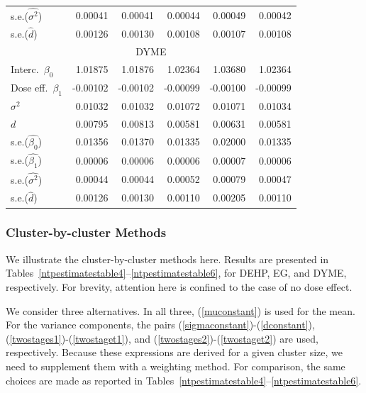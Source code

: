 \documentclass[11pt,a5paper,twoside]{book}
\begin{document}
\begin{table}[!t]
\begin{center}
{\begin{tabular}{lrrrrr}
 s.e.($\widehat{\sigma^2}$) & 0.00041 & 0.00041 & 0.00044 & 0.00049 & 0.00042 \\
 s.e.($\widehat{d}$) & 0.00126 & 0.00130 & 0.00108 & 0.00107 & 0.00108 \\
\hline\hline
\multicolumn{6}{c}{{DYME}}\\
\hline
Interc.\ $\beta_0$& 1.01875 & 1.01876 & 1.02364 & 1.03680 & 1.02364 \\
 Dose eff.\ $\beta_1$ & -0.00102 & -0.00102 & -0.00099 & -0.00100 & -0.00099 \\
 $\sigma^2$ & 0.01032 & 0.01032 & 0.01072 & 0.01071 & 0.01034 \\
$d$ & 0.00795 & 0.00813 & 0.00581 & 0.00631 & 0.00581 \\
\hline
s.e.($\widehat{\beta_0}$) & 0.01356 & 0.01370 & 0.01335 & 0.02000 & 0.01335 \\
s.e.($\widehat{\beta_1}$) & 0.00006 & 0.00006 & 0.00006 & 0.00007 & 0.00006 \\
s.e.($\widehat{\sigma^2}$) & 0.00044 & 0.00044 & 0.00052 & 0.00079 & 0.00047 \\
 s.e.($\widehat{d}$) & 0.00126 & 0.00130 & 0.00110 & 0.00205 & 0.00110 \\
\hline\hline
\end{tabular}}
\end{center}
\end{table}

\subsubsection{Cluster-by-cluster Methods}
\label{cbc}

We illustrate the cluster-by-cluster methods here. Results are 
presented in Tables~\ref{ntpestimatestable4}--\ref{ntpestimatestable6}, 
for DEHP, EG, and DYME, respectively. For brevity, attention here is 
confined to the case of no dose effect.

We consider three alternatives. In all three, (\ref{muconstant})
is used for the mean. For the variance components, 
the pairs (\ref{sigmaconstant})-(\ref{dconstant}), (\ref{twostages1})-(\ref{twostaget1}), and (\ref{twostages2})-(\ref{twostaget2})
are used, respectively. Because 
these expressions are derived for a given cluster size, 
we need to supplement them with a weighting method. For comparison, the 
same choices are made as reported in Tables~\ref{ntpestimatestable4}--\ref{ntpestimatestable6}.
\end{document}
